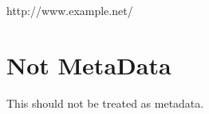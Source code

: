 http:/\slash www.example.net\slash 

\part{Not MetaData}
\label{notmetadata}

This should not be treated as metadata.
